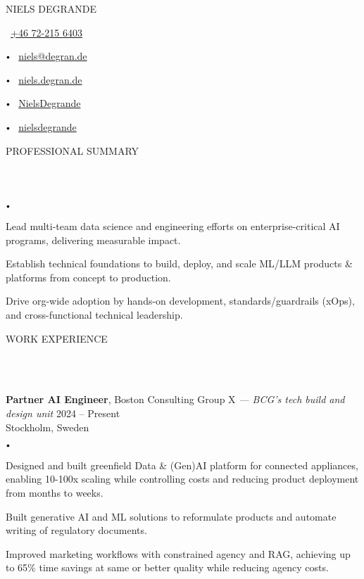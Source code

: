 \documentclass{article}
\newcommand{\contact}[2]{
    \begin{center}
    {\LARGE \uppercase {#1}} \\
    \vspace{8pt}
    #2
    \end{center}
}
\newcommand{\header}[1]{
    {
        \hspace*{-4pt}
        \vspace*{8pt}
        \uppercase{#1}
    }
    \vspace*{-4pt} 
    \lineunder
    \vspace*{8pt}
}
\newcommand{\lineunder}{
    \vspace*{-8pt} \\ 
    \hspace*{-4pt} 
    \hrulefill \\
}
\newcommand{\experience}[5]{
    \vspace*{2pt}
    \textbf{#1}, #2 \hfill #3 \\ 
    #4 \\
    #5
    \vspace*{2pt}
}
\newcommand{\bigdot}{
    $\vcenter{\hbox{\tiny$\bullet$}}$\hspace*{2pt}
}
\newcommand{\spacedbullet}{
    $\vcenter{\hbox{\tiny$\bullet$}}$\hspace*{-2pt}
}
\newenvironment{bulletlist}{
    \begin{list}
        {\spacedbullet}{\setlength\leftmargin{10pt} 
        \topsep 0pt \itemsep -2pt}}{\vspace*{4pt}
    \end{list}
}
\begin{document}
\small

\vspace*{-32pt}

\contact{Niels Degrande}
{
    \faPhone\ \href{tel:+46722156403}{+46 72-215 6403}
    \bigdot \faEnvelope\ \href{mailto:niels@degran.de}{niels@degran.de}
    \bigdot \faGlobe\ \href{https://niels.degran.de}{niels.degran.de}
    \bigdot \faGithub\ \href{https://github.com/NielsDegrande}{NielsDegrande}
    \bigdot \faLinkedin\ \href{https://linkedin.com/in/nielsdegrande}{nielsdegrande}
}

\vspace{16pt}

\header{Professional Summary}
\begin{bulletlist}
    \item Lead multi-team data science and engineering efforts on enterprise-critical AI programs, delivering measurable impact.
    \item Establish technical foundations to build, deploy, and scale ML/LLM products \& platforms from concept to production.
    \item Drive org-wide adoption by hands-on development, standards/guardrails (xOps), and cross-functional technical leadership.
\end{bulletlist}

\vspace*{4pt}

\header{Work Experience}
\experience{Partner AI Engineer}{Boston Consulting Group X \textit{— BCG's tech build and design unit}}{2024 -- Present}{Stockholm, Sweden}
{
    \begin{bulletlist}
        \item Designed and built greenfield Data \& (Gen)AI platform for connected appliances, enabling 10-100x scaling while controlling costs and reducing product deployment from months to weeks.
        \item Built generative AI and ML solutions to reformulate products and automate writing of regulatory documents.
        \item Improved marketing workflows with constrained agency and RAG, achieving up to 65\% time savings at same or better quality while reducing agency costs.
    \end{bulletlist}
}
\end{document}
